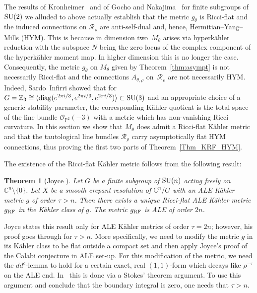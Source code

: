 \documentclass[10pt,a4paper]{amsart}
\numberwithin{equation}{section}
\newcommand{\cO}{\mathcal{O}}
\newcommand{\cR}{\mathcal{R}}
\newcommand{\Z}{{\mathbb Z}}
\newcommand{\C}{{\mathbb C}}
\newcommand{\SU}{{\rm SU}}
\renewcommand{\P}{{\mathbb P}}
\newcommand{\diag}{\operatorname{diag}}
\newcommand{\iso}{\cong}
\newcommand{\RF}{{\rm RF}}
\newtheorem{Theorem}{Theorem}[section]
\begin{document}
The results of Kronheimer~\cite{Kronheimer1989} and of Gocho and Nakajima~\cite{Gocho1992} for f\/inite subgroups of $\SU(2)$ we alluded to above actually establish that the metric $g_{\theta}$ is Ricci-f\/lat and the induced connections on $\cR_{\rho}$ are anti-self-dual and, hence, Hermitian--Yang--Mills (HYM).
This is because in dimension two~$M_\theta$ arises via hyperk\"ahler reduction with the subspace $N$ being the zero locus of the complex component of the hyperk\"ahler moment map.
In higher dimension this is no longer the case.
Consequently, the metric $g_\theta$ on $M_\theta$ given by
Theorem~\ref{thm:asympt} is not necessarily Ricci-f\/lat and the
connections $A_{\theta,\rho}$ on~$\cR_\rho$ are not necessarily HYM.
Indeed, Sardo~Inf\/irri \cite[Example~7.1]{SardoInfirri1996} showed
that for $G=\Z_3\iso\langle \diag(e^{2\pi i/3},e^{2\pi i/3},e^{2\pi
  i/3})\rangle \subset\SU(3)$ and an appropriate choice of a generic
stability parameter, the corresponding K\"ahler quotient is the total
space of the line bundle $\cO_{\P^2}(-3)$ with a metric which has
non-vanishing Ricci curvature.
In this section we show that $M_\theta$ does admit a Ricci-f\/lat
K\"ahler metric and that the tautological line bundles $\cR_\rho$ carry asymptotically f\/lat HYM
connections, thus proving the f\/irst two parts of Theorem~\ref{Thm_KRF_HYM}.

The existence of the Ricci-f\/lat K\"ahler metric follows from the
following result:

\begin{Theorem}[Joyce ]\label{thm:rf}
  Let $G$ be a finite subgroup of $\SU(n)$ acting freely on
  $\C^n{\setminus} \{0\}$.  Let $X$ be a smooth crepant resolution of
  $\C^n/G$ with an ALE K\"ahler metric $g$ of order $\tau>n$.  Then
  there exists a unique Ricci-flat ALE K\"ahler metric $g_\RF$ in the
  K\"ahler class of $g$.  The metric $g_\RF$ is ALE of order $2n$.
\end{Theorem}

\begin{Remark}
  Joyce states this result only for ALE K\"ahler metrics of order $\tau
  =2n$; however, his proof goes through for $\tau >n$. More specif\/ically, we need to modify the metric $g$ in its K\"ahler class to be f\/lat outside a compact set and then apply Joyce's proof of the Calabi conjecture in ALE set-up. For this modif\/ication of the metric, we need the $dd^c$-lemma to hold for a certain exact, real $(1,1)$-form which decays like $\rho^{-\tau}$ on the ALE end.
In~\cite[Theorem~8.4.4]{Joyce2000} this is done via a Stokes' theorem argument. To use this argument and conclude that the boundary integral is zero, one needs that $\tau > n$.
\end{Remark}
\end{document}
